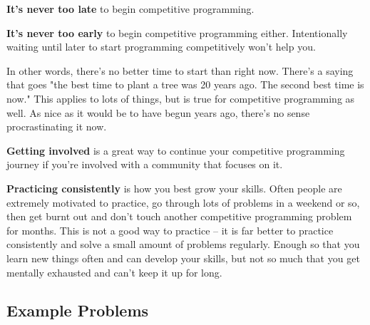\textbf{It's never too late} to begin competitive programming.

\textbf{It's never too early} to begin competitive programming either. Intentionally waiting until later to start programming competitively won't help you.

In other words, there's no better time to start than right now. There's a saying that goes "the best time to plant a tree was 20 years ago. The second best time is now." This applies to lots of things, but is true for competitive programming as well. As nice as it would be to have begun years ago, there's no sense procrastinating it now.

\textbf{Getting involved} is a great way to continue your competitive programming journey if you're involved with a community that focuses on it.

\textbf{Practicing consistently} is how you best grow your skills. Often people are extremely motivated to practice, go through lots of problems in a weekend or so, then get burnt out and don't touch another competitive programming problem for months. This is not a good way to practice -- it is far better to practice consistently and solve a small amount of problems regularly. Enough so that you learn new things often and can develop your skills, but not so much that you get mentally exhausted and can't keep it up for long.

\subsection{Example Problems}